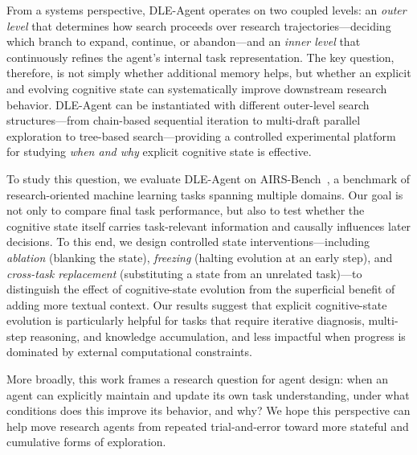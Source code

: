 \documentclass{article} %
\begin{document}
From a systems perspective, DLE-Agent operates on two coupled levels: an
\emph{outer level} that determines how search proceeds over research
trajectories---deciding which branch to expand, continue, or
abandon---and an \emph{inner level} that continuously refines the agent's
internal task representation. The key question, therefore, is not simply
whether additional memory helps, but whether an explicit and evolving
cognitive state can systematically improve downstream research behavior.
DLE-Agent can be instantiated with different outer-level search
structures---from chain-based sequential iteration to multi-draft parallel
exploration to tree-based search---providing a controlled experimental
platform for studying \emph{when and why} explicit cognitive state is
effective.

To study this question, we evaluate DLE-Agent on
AIRS-Bench~\citep{airsbench2025}, a benchmark of research-oriented machine
learning tasks spanning multiple domains. Our goal is not only to compare
final task performance, but also to test whether the cognitive state itself
carries task-relevant information and causally influences later decisions. To
this end, we design controlled state interventions---including
\emph{ablation} (blanking the state), \emph{freezing} (halting evolution at an
early step), and \emph{cross-task replacement} (substituting a state from an
unrelated task)---to distinguish the effect of cognitive-state evolution from
the superficial benefit of adding more textual context. Our results suggest
that explicit cognitive-state evolution is particularly helpful for tasks that
require iterative diagnosis, multi-step reasoning, and knowledge accumulation,
and less impactful when progress is dominated by external computational
constraints.

More broadly, this work frames a research question for agent design: when an
agent can explicitly maintain and update its own task understanding, under
what conditions does this improve its behavior, and why? We hope this
perspective can help move research agents from repeated trial-and-error toward
more stateful and cumulative forms of exploration.
\end{document}

